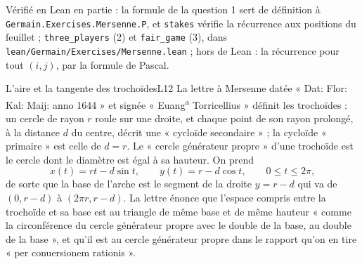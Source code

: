 \documentclass[11pt,a4paper]{article}
\begin{document}
\begin{solution}
Vérifié en Lean en partie : la formule de la question 1 sert de définition à
\texttt{Germain.Exercises.Mersenne.P}, et \texttt{stakes} vérifie la récurrence aux positions du
feuillet ; \texttt{three\_players} (2) et \texttt{fair\_game} (3), dans \texttt{lean/Germain/Exercises/Mersenne.lean} ;
hors de Lean : la récurrence pour tout $(i, j)$, par la formule de Pascal.
\end{solution}

\begin{exercice}{L'aire et la tangente des trochoïdes}{L1}{2}
La lettre à Mersenne datée « Dat: Flor: Kal: Maij: anno 1644 » et signée
« Euang\textsuperscript{a} Torricellius » définit les trochoïdes : un cercle de
rayon $r$ roule sur une droite, et chaque point de son rayon prolongé, à la
distance $d$ du centre, décrit une « cycloïde secondaire » ; la cycloïde
« primaire » est celle de $d = r$. Le « cercle générateur propre » d'une
trochoïde est le cercle dont le diamètre est égal à sa hauteur. On prend
\[
x(t) = rt - d\sin t, \qquad y(t) = r - d\cos t, \qquad 0 \le t \le 2\pi,
\]
de sorte que la base de l'arche est le segment de la droite $y = r - d$ qui va de
$(0, r-d)$ à $(2\pi r, r-d)$. La lettre énonce que l'espace compris entre la
trochoïde et sa base est au triangle de même base et de même hauteur « comme la
circonférence du cercle générateur propre avec le double de la base, au double de
la base », et qu'il est au cercle générateur propre dans le rapport qu'on en tire
« per conuersionem rationis ».



\end{exercice}
\end{document}
